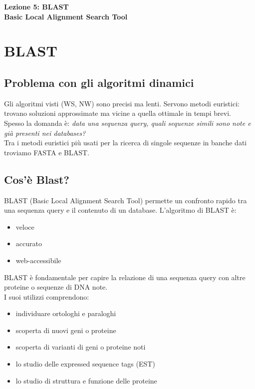 \documentclass{article}
\begin{document}
\begin{titlepage}
    \begin{center}
        \vspace*{1cm}
        \LARGE
        \textbf{Lezione 5: BLAST\\Basic Local Alignment Search Tool}

    \end{center}
\end{titlepage}
\section{BLAST}
\subsection{Problema con gli algoritmi dinamici}
Gli algoritmi visti (WS, NW) sono precisi ma lenti.
Servono metodi euristici: trovano soluzioni
approssimate ma vicine a quella ottimale in tempi
brevi.\\
Spesso la domanda è: \textit{data una sequenza query, quali
sequenze simili sono note e già presenti nei
databases?}\\
Tra i metodi euristici più usati per la ricerca di singole
sequenze in banche dati troviamo FASTA e BLAST.
\subsection{Cos'è Blast?}
BLAST (Basic Local Alignment Search Tool)
permette un confronto rapido tra una sequenza
query e il contenuto di un database.
L'algoritmo di BLAST è:
\begin{itemize}
    \item veloce
    \item accurato
    \item web-accessibile 
\end{itemize}
BLAST è fondamentale per capire la relazione di
una sequenza query con altre proteine o
sequenze di DNA note.\\
I suoi utilizzi comprendono:
\begin{itemize}
    \item individuare ortologhi e paraloghi
    \item scoperta di nuovi geni o proteine
    \item scoperta di varianti di geni o proteine noti
    \item lo studio delle expressed sequence tags (EST)
    \item lo studio di struttura e funzione delle proteine
\end{itemize}
\end{document}
